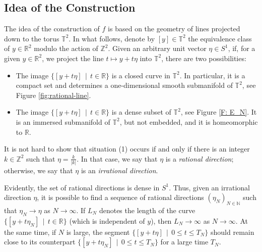 \documentclass[12pt]{amsart}
\begin{document}
\subsection{Idea of the Construction} \label{S: idea of construction} The idea of the construction of $f$  is based on the geometry of lines projected down to the torus $\mathbb{T}^{2}$. In what follows, denote by $[y] \in \mathbb{T}^{2}$ the equivalence class of $y \in \mathbb{R}^{2}$ modulo the action of $\mathbb{Z}^{2}$. Given an arbitrary unit vector $\eta \in S^{1}$, if, for a given $y \in \mathbb{R}^{2}$, we project the line $t \mapsto y + t \eta$ into $\mathbb{T}^{2}$, there are two possibilities:
	\begin{itemize}
		\item[(1)] The image $\{[y + t \eta] \, \mid \, t \in \mathbb{R}\}$ is a closed curve in $\mathbb{T}^{2}$. In particular, it is a compact set and determines a one-dimensional smooth submanifold of $\mathbb{T}^{2}$, see Figure \ref{fig:rational-line}.
		\item[(2)] The image $\{[y + t \eta] \, \mid \,t \in \mathbb{R}\}$ is a dense subset of $\mathbb{T}^{2}$, see Figure \ref{F: E_N}. It is an immersed submanifold of $\mathbb{T}^{2}$, but not embedded, and it is homeomorphic to $\mathbb{R}$.
	\end{itemize} 
It is not hard to show that situation (1) occurs if and only if there is an integer $k \in \mathbb{Z}^{2}$ such that $\eta = \frac{k}{|k|}$. In that case, we say that $\eta$ is a \emph{rational direction}; otherwise, we say that $\eta$ is an \emph{irrational direction}. 

Evidently, the set of rational directions is dense in $S^{1}$. Thus, given an irrational direction $\eta$, it is possible to find a sequence of rational directions $(\eta_{N})_{N \in \mathbb{N}}$ such that $\eta_{N} \to \eta$ as $N \to \infty$. If $L_{N}$ denotes the length of the curve $\{[y + t \eta_{N}] \, \mid \, t \in \mathbb{R}\}$ (which is independent of $y$), then $L_{N} \to \infty$ as $N \to \infty$. At the same time, if $N$ is large, the segment $\{[y + t \eta] \, \mid \, 0 \leq t \leq T_{N}\}$ should remain close to its counterpart $\{[y + t \eta_{N}] \, \mid \, 0 \leq t \leq T_{N}\}$ for a large time $T_{N}$.
\end{document}
